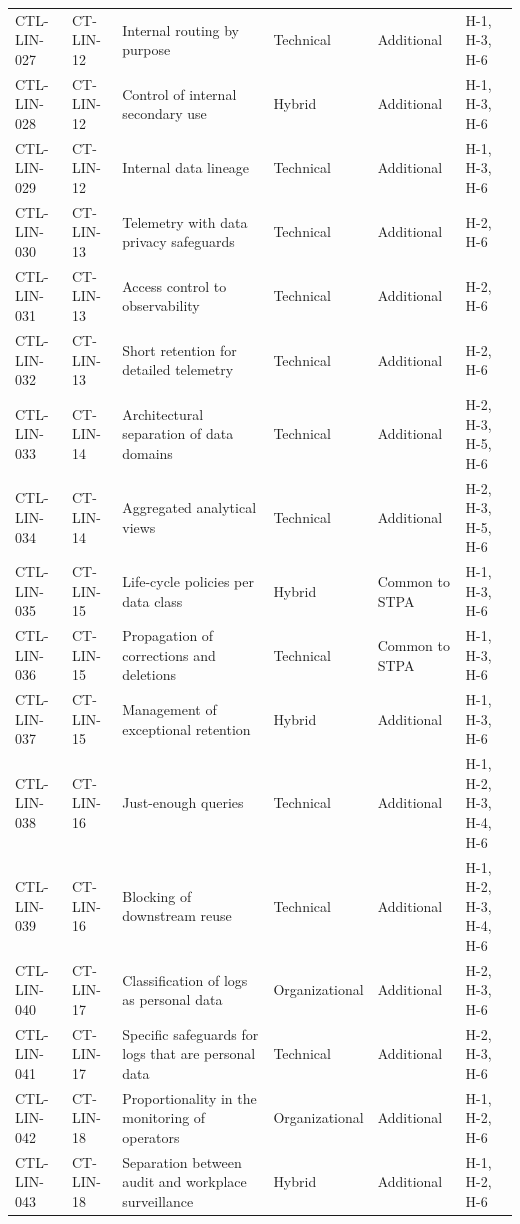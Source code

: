 \begin{footnotesize}
\begin{longtable}{l p{} p{} p{} p{} p{}}
        CTL-LIN-027 & CT-LIN-12 & Internal routing by purpose & Technical & Additional & H-1, H-3, H-6 \\
        CTL-LIN-028 & CT-LIN-12 & Control of internal secondary use & Hybrid & Additional & H-1, H-3, H-6 \\
        CTL-LIN-029 & CT-LIN-12 & Internal data lineage & Technical & Additional & H-1, H-3, H-6 \\
        CTL-LIN-030 & CT-LIN-13 & Telemetry with data privacy safeguards & Technical & Additional & H-2, H-6 \\
        CTL-LIN-031 & CT-LIN-13 & Access control to observability & Technical & Additional & H-2, H-6 \\
        CTL-LIN-032 & CT-LIN-13 & Short retention for detailed telemetry & Technical & Additional & H-2, H-6 \\
        CTL-LIN-033 & CT-LIN-14 & Architectural separation of data domains & Technical & Additional & H-2, H-3, H-5, H-6 \\
        CTL-LIN-034 & CT-LIN-14 & Aggregated analytical views & Technical & Additional & H-2, H-3, H-5, H-6 \\
        CTL-LIN-035 & CT-LIN-15 & Life-cycle policies per data class & Hybrid & Common to STPA & H-1, H-3, H-6 \\
        CTL-LIN-036 & CT-LIN-15 & Propagation of corrections and deletions & Technical & Common to STPA & H-1, H-3, H-6 \\
        CTL-LIN-037 & CT-LIN-15 & Management of exceptional retention & Hybrid & Additional & H-1, H-3, H-6 \\
        CTL-LIN-038 & CT-LIN-16 & Just-enough queries & Technical & Additional & H-1, H-2, H-3, H-4, H-6 \\
        CTL-LIN-039 & CT-LIN-16 & Blocking of downstream reuse & Technical & Additional & H-1, H-2, H-3, H-4, H-6 \\
        CTL-LIN-040 & CT-LIN-17 & Classification of logs as personal data & Organizational & Additional & H-2, H-3, H-6 \\
        CTL-LIN-041 & CT-LIN-17 & Specific safeguards for logs that are personal data & Technical & Additional & H-2, H-3, H-6 \\
        CTL-LIN-042 & CT-LIN-18 & Proportionality in the monitoring of operators & Organizational & Additional & H-1, H-2, H-6 \\
        CTL-LIN-043 & CT-LIN-18 & Separation between audit and workplace surveillance & Hybrid & Additional & H-1, H-2, H-6 \\

\end{longtable}
\end{footnotesize}
